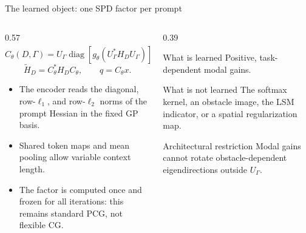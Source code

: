 \documentclass[aspectratio=169,10pt]{beamer}
\begin{document}
\begin{frame}{The learned object: one SPD factor per prompt}
\begin{columns}[T,onlytextwidth]
\begin{column}{0.57\textwidth}
  \begin{equation*}
  C_\theta(D,\Gamma)=U_\Gamma
  \operatorname{diag}\!\left[g_\theta(U_\Gamma^*H_DU_\Gamma)\right]^{1/2}
  U_\Gamma^*,\qquad g_\theta>0 .
  \end{equation*}
  \begin{equation*}
    \widetilde H_D=C_\theta^*H_DC_\theta,\qquad q=C_\theta x .
  \end{equation*}
  \begin{itemize}
    \item The encoder reads the diagonal, row-$\ell_1$, and row-$\ell_2$ norms of the prompt Hessian in the fixed GP basis.
    \item Shared token maps and mean pooling allow variable context length.
    \item The factor is computed once and frozen for all iterations: this remains standard PCG, not flexible CG.
  \end{itemize}
\end{column}
\begin{column}{0.39\textwidth}
  \begin{block}{What is learned}
    Positive, task-dependent modal gains.
  \end{block}
  \begin{block}{What is not learned}
    The softmax kernel, an obstacle image, the LSM indicator, or a spatial regularization map.
  \end{block}
  \begin{alertblock}{Architectural restriction}
    Modal gains cannot rotate obstacle-dependent eigendirections outside $U_\Gamma$.
  \end{alertblock}
\end{column}
\end{columns}
\end{frame}
\end{document}
